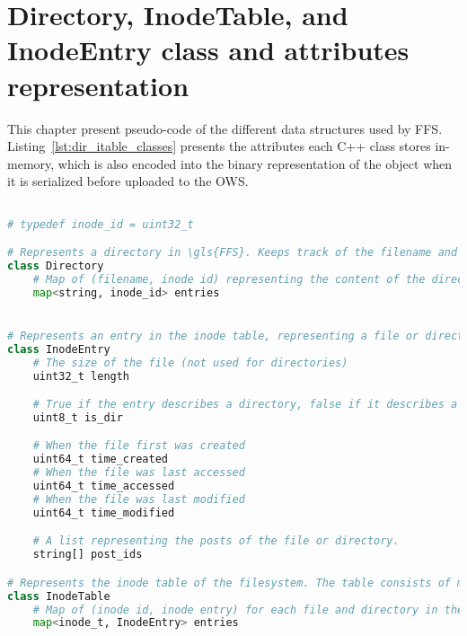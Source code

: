 \chapter{Directory, InodeTable, and InodeEntry class and attributes representation}
This chapter present pseudo-code of the different data structures used by \gls{FFS}. Listing~\ref{lst:dir_itable_classes} presents the attributes each C++ class stores in-memory, which is also encoded into the binary representation of the object when it is serialized before uploaded to the \gls{OWS}.

\label{app:inode_dir_code}
\begin{lstlisting}[language=python, caption={The attributes classes representing directories and the inode table in \gls{FFS}}, label=lst:dir_itable_classes,breaklines=true]

# typedef inode_id = uint32_t

# Represents a directory in \gls{FFS}. Keeps track of the filename and inode of each file
class Directory
	# Map of (filename, inode id) representing the content of the directory
	map<string, inode_id> entries


# Represents an entry in the inode table, representing a file or directory
class InodeEntry
	# The size of the file (not used for directories) 
	uint32_t length

	# True if the entry describes a directory, false if it describes a file
	uint8_t is_dir

	# When the file first was created
	uint64_t time_created
	# When the file was last accessed
	uint64_t time_accessed
	# When the file was last modified
	uint64_t time_modified

	# A list representing the posts of the file or directory. 
	string[] post_ids

# Represents the inode table of the filesystem. The table consists of multiple inode entries
class InodeTable
	# Map of (inode id, inode entry) for each file and directory in the filesystem
	map<inode_t, InodeEntry> entries

\end{lstlisting}